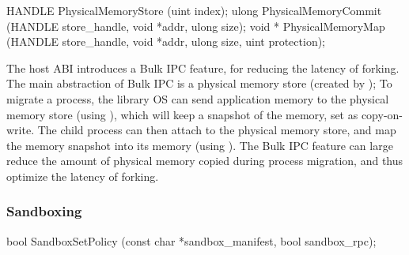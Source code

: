 \begin{paldef}
HANDLE PhysicalMemoryStore  (uint index);
ulong  PhysicalMemoryCommit (HANDLE store_handle,
                             void *addr, ulong size);
void * PhysicalMemoryMap    (HANDLE store_handle,
                             void *addr, ulong size,
                             uint protection);
\end{paldef}


The host ABI introduces a Bulk IPC feature, for reducing the latency of forking.
The main abstraction of Bulk IPC
is a physical memory store (created by );
To migrate a process, the library OS
can send application memory to the physical memory store (using ), which will keep a snapshot of the memory, set as copy-on-write.
The child process can then attach to the physical memory store,
and map the memory snapshot into its memory (using ).
The Bulk IPC feature can large reduce the amount of physical memory copied during process migration,
and thus optimize the latency of forking.




\subsubsection*{Sandboxing}


\begin{paldef}
bool SandboxSetPolicy (const char *sandbox_manifest,
                       bool sandbox_rpc);
\end{paldef}



